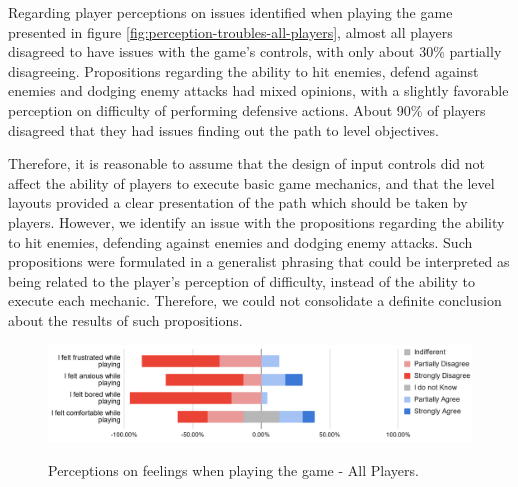 Regarding player perceptions on issues identified when playing the game presented in figure \ref{fig:perception-troubles-all-players}, almost all players disagreed to have issues with the game's controls, with only about 30\% partially disagreeing. Propositions regarding the ability to hit enemies, defend against enemies and dodging enemy attacks had mixed opinions, with a slightly favorable perception on difficulty of performing defensive actions. About 90\% of players disagreed that they had issues finding out the path to level objectives.

Therefore, it is reasonable to assume that the design of input controls did not affect the ability of players to execute basic game mechanics, and that the level layouts provided a clear presentation of the path which should be taken by players. However, we identify an issue with the propositions regarding the ability to hit enemies, defending against enemies and dodging enemy attacks. Such propositions were formulated in a generalist phrasing that could be interpreted as being related to the player's perception of difficulty, instead of the ability to execute each mechanic. Therefore, we could not consolidate a definite conclusion about the results of such propositions.

\begin{figure}[!ht]
    \begin{center}
    \caption{Perceptions on feelings when playing the game - All Players.}
        \includegraphics[width=36em]{figures/fig-perception-feelings-all-players.png}
        \label{fig:perception-feelings-all-players}
    \end{center}
\end{figure}

